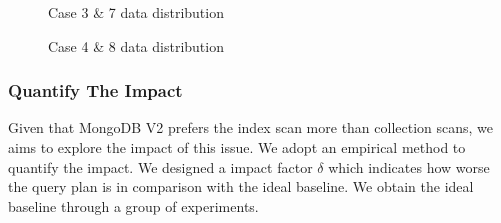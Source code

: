 \begin{figure}[h]
    \caption{Case 3 \& 7 data distribution}
    \label{fig:case3}
\end{figure}

\begin{figure}[h]
    \caption{Case 4 \& 8 data distribution}
    \label{fig:case4}
\end{figure}


\subsubsection{Quantify The Impact}
Given that MongoDB V2 prefers the index scan more than 
collection scans, we aims to explore the impact of this
issue. We adopt an empirical method to quantify the 
impact. We designed a impact factor $\delta$ which 
indicates how worse the query plan is in comparison 
with the ideal baseline. We obtain the ideal baseline
through a group of experiments. 

